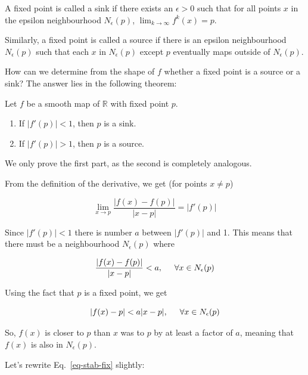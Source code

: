 A fixed point is called a sink if there exists an $\epsilon > 0$ such that for all points $x$ in the epsilon neighbourhood $N_\epsilon(p)$, $\lim_{k \to \infty} f^k(x) = p$.

Similarly, a fixed point is called a source if there is an epsilon neighbourhood $N_\epsilon(p)$ such that each $x$ in $N_\epsilon(p)$ except $p$ eventually maps outside of $N_\epsilon(p)$.

How can we determine from the shape of $f$ whether a fixed point is a source or a sink? The answer lies in the following theorem:

\begin{thm}
\label{th-stab-fix}
Let $f$ be a smooth map of $\mathbb{R}$ with fixed point $p$. 
\begin{enumerate}
\item
If $|f'(p)| < 1$, then $p$ is a sink.
\item 
If $|f'(p)| > 1$, then $p$ is a source. 
\end{enumerate}
\end{thm} 

We only prove the first part, as the second is completely analogous.

From the definition of the derivative, we get (for points $x \ne p$)

\begin{equation}
\lim_{x \to p} \frac{\left|f(x)-f(p)\right|}{|x-p|} = \left|f'(p)\right|
\end{equation} 

Since $|f'(p)| < 1$ there is number $a$ between $|f'(p)|$ and 1. This means that there must be a neighbourhood $N_\epsilon(p)$ where

\begin{equation}
\frac{\left|f(x)-f(p)\right|}{|x-p|} < a, \hspace{.5cm} \forall x \in N_\epsilon(p)
\end{equation}

Using the fact that $p$ is a fixed point, we get

\begin{equation}
\left|f(x)-p\right| < a |x-p|,  \hspace{.5cm} \forall x \in N_\epsilon(p) \label{eq-stab-fix}
\end{equation}

So, $f(x)$ is closer to $p$ than $x$ was to $p$ by at least a factor of $a$, meaning that $f(x)$ is also in $N_\epsilon(p)$.

Let's rewrite Eq.~\ref{eq-stab-fix} slightly:


